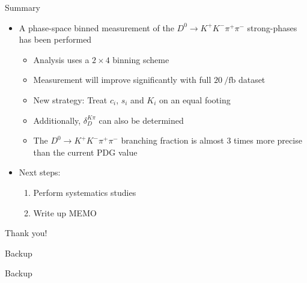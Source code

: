 \documentclass{beamer}
\begin{document}
\begin{frame}{Summary}
  \begin{itemize}
    \setlength\itemsep{1.0em}
    \item{A phase-space binned measurement of the $D^0\to K^+K^-\pi^+\pi^-$ strong-phases has been performed}
    \begin{itemize}
      \setlength\itemsep{0.7em}
      \item{Analysis uses a $2\times 4$ binning scheme}
      \item{Measurement will improve significantly with full $\SI{20}{\per\femto\barn}$ dataset}
      \item{New strategy: Treat $c_i$, $s_i$ and $K_i$ on an equal footing}
      \item{Additionally, $\delta_D^{K\pi}$ can also be determined}
      \item{The $D^0\to K^+K^-\pi^+\pi^-$ branching fraction is almost $3$ times more precise than the current PDG value}
    \end{itemize}
    \item{Next steps:}
    \begin{enumerate}
      \setlength\itemsep{0.7em}
      \item{Perform systematics studies}
      \item{Write up MEMO}
    \end{enumerate}
  \end{itemize}
  \begin{center}
    {\huge Thank you!}
  \end{center}
\end{frame}

\begin{frame}{Backup}
  \begin{center}
    {\huge Backup}
  \end{center}
\end{frame}
\end{document}
